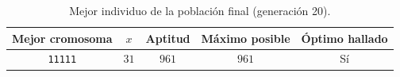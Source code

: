 \begin{table}[H]
\centering
\small
\setlength{\tabcolsep}{6pt}
\renewcommand{\arraystretch}{1.15}
\begin{tabular}{|c|c|c|c|c|}
\hline
\rowcolor{encabezado}\textbf{Mejor cromosoma} & \textbf{$x$} & \textbf{Aptitud} & \textbf{Máximo posible} & \textbf{Óptimo hallado} \\
\hline
\texttt{11111} & $31$ & $961$ & $961$ & Sí \\
\hline
\end{tabular}
\caption{Mejor individuo de la población final (generación 20).}
\label{tab:p1b-resumen}
\end{table}
